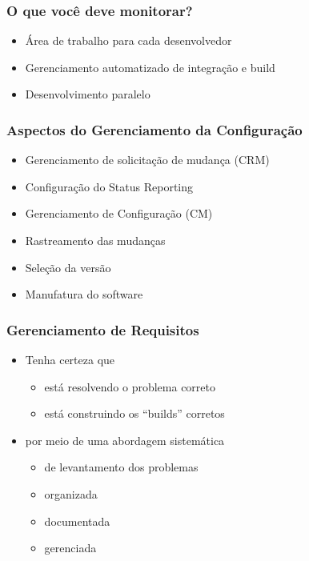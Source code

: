 \begin{frame}
\frametitle{O que você deve monitorar?}
 \begin{itemize}
  \item Área de trabalho para cada desenvolvedor
  \item Gerenciamento automatizado de integração e build
  \item Desenvolvimento paralelo
  \end{itemize}
\end{frame}


\begin{frame}
\frametitle{Aspectos do Gerenciamento da  Configuração}
 \begin{itemize}
  \item Gerenciamento de solicitação de mudança (CRM)
  \item Configuração do Status Reporting 
  \item Gerenciamento de Configuração (CM)
  \item Rastreamento das mudanças
  \item Seleção da versão
  \item Manufatura do software
  \end{itemize}
\end{frame}

\begin{frame}
 \frametitle{Gerenciamento de Requisitos}
 \begin{itemize}
  \item Tenha certeza que
  \begin{itemize}
   \item está resolvendo o problema correto
   \item está construindo os “builds” corretos
  \end{itemize}
  \item por meio de uma abordagem sistemática
  \begin{itemize}
   \item de levantamento dos problemas
   \item organizada
   \item documentada
   \item gerenciada 
   \end{itemize}

 \end{itemize}

\end{frame}


